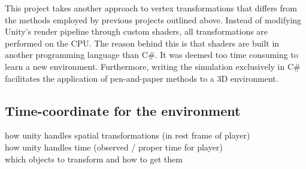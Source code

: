 \documentclass[a4paper]{article}
\begin{document}
This project takes another approach to vertex transformations that differs from the methods employed by previous projects outlined above. Instead of modifying Unity's render pipeline through custom shaders, all transformations are performed on the CPU. The reason behind this is that shaders are built in another programming language than C#. It was deemed too time consuming to learn a new environment. Furthermore, writing the simulation exclusively in C# facilitates the application of pen-and-paper methods to a 3D environment.

\subsection{Time-coordinate for the environment}



how unity handles spatial transformations (in rest frame of player)\\
how unity handles time (observed / proper time for player)\\
which objects to transform and how to get them\\


    
\end{document}
